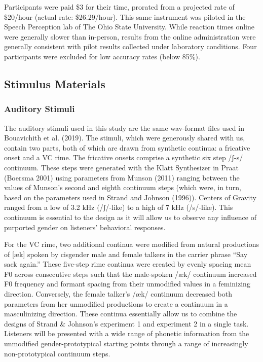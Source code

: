 \documentclass[
  letterpaper,
  DIV=11,
  numbers=noendperiod]{scrartcl}
\begin{document}
Participants were paid \$3 for their time, prorated from a projected
rate of \$20/hour (actual rate: \$26.29/hour). This same instrument was
piloted in the Speech Perception lab of The Ohio State University. While
reaction times online were generally slower than in-person, results from
the online administration were generally consistent with pilot results
collected under laboratory conditions. Four participants were excluded
for low accuracy rates (below 85\%).

\subsection{Stimulus Materials}\label{sec-stimuli}

\subsubsection{Auditory Stimuli}\label{sec-stimuli-auditory}

The auditory stimuli used in this study are the same wav-format files
used in Bouavichith et al. (2019). The stimuli, which were generously
shared with us, contain two parts, both of which are drawn from
synthetic continua: a fricative onset and a VC rime. The fricative
onsets comprise a synthetic six step /ʃ-s/ continuum. These steps were
generated with the Klatt Synthesizer in Praat (Boersma 2001) using
parameters from Munson (2011) ranging between the values of Munson's
second and eighth continuum steps (which were, in turn, based on the
parameters used in Strand and Johnson (1996)). Centers of Gravity ranged
from a low of 3.2 kHz (/ʃ/-like) to a high of 7 kHz (/s/-like). This
continuum is essential to the design as it will allow us to observe any
influence of purported gender on listeners' behavioral responses.

For the VC rime, two additional continua were modified from natural
productions of {[}æk{]} spoken by cisgender male and female talkers in
the carrier phrase ``Say sack again.'' These five-step rime continua
were created by evenly spacing mean F0 across consecutive steps such
that the male-spoken /æk/ continuum increased F0 frequency and formant
spacing from their unmodified values in a feminizing direction.
Conversely, the female talker's /æk/ continuum decreased both parameters
from her unmodified productions to create a continuum in a masculinizing
direction. These continua essentially allow us to combine the designs of
Strand \& Johnson's experiment 1 and experiment 2 in a single task.
Listeners will be presented with a wide range of phonetic information
from the unmodified gender-prototypical starting points through a range
of increasingly non-prototypical continuum steps.
\end{document}
